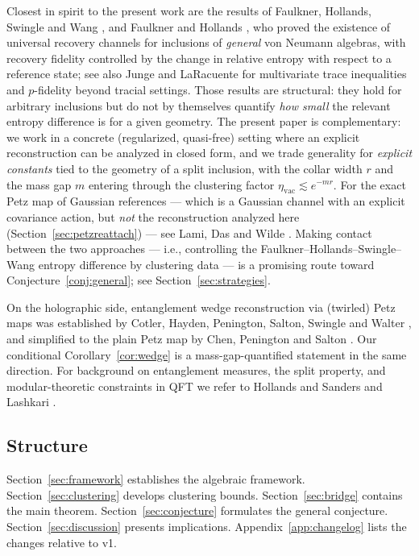 \documentclass[11pt,a4paper]{article}
\theoremstyle{plain}
\theoremstyle{definition}
\theoremstyle{remark}
\newcommand{\etavac}{\eta_{\mathrm{vac}}}
\begin{document}
Closest in spirit to the present work are the results of Faulkner, Hollands, Swingle
and Wang \cite{FHSW22}, and Faulkner and Hollands \cite{FH22}, who proved the
existence of universal recovery channels for inclusions of \emph{general} von Neumann
algebras, with recovery fidelity controlled by the change in relative entropy with
respect to a reference state; see also Junge and LaRacuente \cite{JungeLaRacuente22}
for multivariate trace inequalities and $p$-fidelity beyond tracial settings. Those
results are structural: they hold for arbitrary inclusions but do not by themselves
quantify \emph{how small} the relevant entropy difference is for a given geometry.
The present paper is complementary: we work in a concrete (regularized, quasi-free)
setting where an explicit reconstruction can be analyzed in closed form, and we
trade generality for \emph{explicit constants} tied to the geometry of a split
inclusion, with the collar width $r$ and the mass gap $m$ entering through the
clustering factor $\etavac \lesssim e^{-mr}$. For the exact Petz map of Gaussian
references --- which is a Gaussian channel with an explicit covariance action, but
\emph{not} the reconstruction analyzed here (Section~\ref{sec:petzreattach}) ---
see Lami, Das and Wilde \cite{LamiDasWilde18}. Making contact between the two approaches --- i.e.,
controlling the Faulkner--Hollands--Swingle--Wang entropy difference by clustering
data --- is a promising route toward Conjecture~\ref{conj:general}; see
Section~\ref{sec:strategies}.

On the holographic side, entanglement wedge reconstruction via (twirled) Petz maps
was established by Cotler, Hayden, Penington, Salton, Swingle and Walter
\cite{CotlerEtAl19}, and simplified to the plain Petz map by Chen, Penington and
Salton \cite{ChenPS20}. Our conditional Corollary~\ref{cor:wedge} is a
mass-gap-quantified statement in the same direction. For background on entanglement
measures, the split property, and modular-theoretic constraints in QFT we refer to
Hollands and Sanders \cite{HollandsSanders18} and Lashkari \cite{Lashkari19}.

\subsection{Structure}

Section~\ref{sec:framework} establishes the algebraic framework.
Section~\ref{sec:clustering} develops clustering bounds. Section~\ref{sec:bridge}
contains the main theorem. Section~\ref{sec:conjecture} formulates the general
conjecture. Section~\ref{sec:discussion} presents implications.
Appendix~\ref{app:changelog} lists the changes relative to v1.
\end{document}
